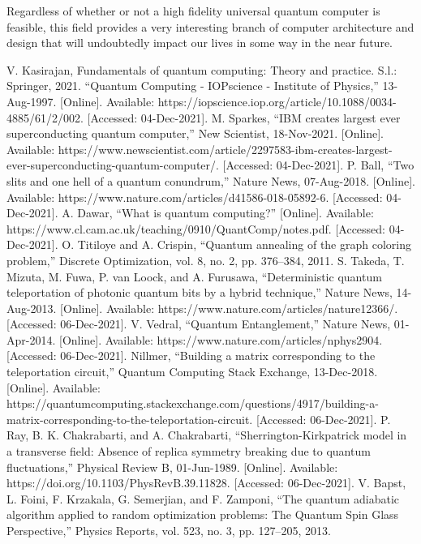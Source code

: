 \documentclass[conference]{IEEEtran}
\begin{document}
Regardless of whether or not a high fidelity universal quantum computer is feasible, this field provides a very interesting branch of computer architecture and design that will undoubtedly impact our lives in some way in the near future.

\begin{thebibliography}{00}
 V. Kasirajan, Fundamentals of quantum computing: Theory and practice. S.l.: Springer, 2021.
 “Quantum Computing - IOPscience - Institute of Physics,” 13-Aug-1997. [Online]. Available: https://iopscience.iop.org/article/10.1088/0034-4885/61/2/002. [Accessed: 04-Dec-2021]. 
 M. Sparkes, “IBM creates largest ever superconducting quantum computer,” New Scientist, 18-Nov-2021. [Online]. Available: https://www.newscientist.com/article/2297583-ibm-creates-largest-ever-superconducting-quantum-computer/. [Accessed: 04-Dec-2021]. 
 P. Ball, “Two slits and one hell of a quantum conundrum,” Nature News, 07-Aug-2018. [Online]. Available: https://www.nature.com/articles/d41586-018-05892-6. [Accessed: 04-Dec-2021].
 A. Dawar, “What is quantum computing?” [Online]. Available: https://www.cl.cam.ac.uk/teaching/0910/QuantComp/notes.pdf. [Accessed: 04-Dec-2021].
 O. Titiloye and A. Crispin, “Quantum annealing of the graph coloring problem,” Discrete Optimization, vol. 8, no. 2, pp. 376–384, 2011. 
 S. Takeda, T. Mizuta, M. Fuwa, P. van Loock, and A. Furusawa, “Deterministic quantum teleportation of photonic quantum bits by a hybrid technique,” Nature News, 14-Aug-2013. [Online]. Available: https://www.nature.com/articles/nature12366/. [Accessed: 06-Dec-2021]. 
 V. Vedral, “Quantum Entanglement,” Nature News, 01-Apr-2014. [Online]. Available: https://www.nature.com/articles/nphys2904. [Accessed: 06-Dec-2021]. 
 Nillmer, “Building a matrix corresponding to the teleportation circuit,” Quantum Computing Stack Exchange, 13-Dec-2018. [Online]. Available: https://quantumcomputing.stackexchange.com/questions/4917/building-a-matrix-corresponding-to-the-teleportation-circuit. [Accessed: 06-Dec-2021].
 P. Ray, B. K. Chakrabarti, and A. Chakrabarti, “Sherrington-Kirkpatrick model in a transverse field: Absence of replica symmetry breaking due to quantum fluctuations,” Physical Review B, 01-Jun-1989. [Online]. Available: https://doi.org/10.1103/PhysRevB.39.11828. [Accessed: 06-Dec-2021]. 
 V. Bapst, L. Foini, F. Krzakala, G. Semerjian, and F. Zamponi, “The quantum adiabatic algorithm applied to random optimization problems: The Quantum Spin Glass Perspective,” Physics Reports, vol. 523, no. 3, pp. 127–205, 2013.

\end{thebibliography}
\end{document}

